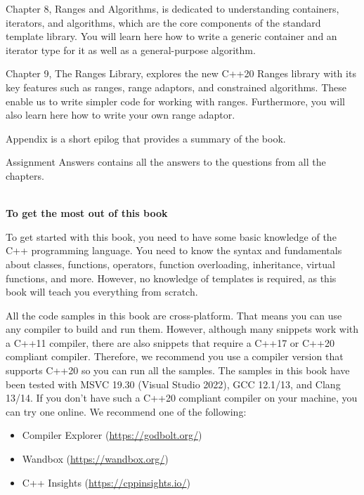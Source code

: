Chapter 8, Ranges and Algorithms, is dedicated to understanding containers, iterators, and algorithms, which are the core components of the standard template library. You will learn here how to write a generic container and an iterator type for it as well as a general-purpose algorithm.

Chapter 9, The Ranges Library, explores the new C++20 Ranges library with its key features such as ranges, range adaptors, and constrained algorithms. These enable us to write simpler code for working with ranges. Furthermore, you will also learn here how to write your own range adaptor.

Appendix is a short epilog that provides a summary of the book.

Assignment Answers contains all the answers to the questions from all the chapters.

\hspace*{\fill} \\ %
\noindent
\textbf{To get the most out of this book}

To get started with this book, you need to have some basic knowledge of the C++ programming language. You need to know the syntax and fundamentals about classes, functions, operators, function overloading, inheritance, virtual functions, and more. However, no knowledge of templates is required, as this book will teach you everything from scratch.

All the code samples in this book are cross-platform. That means you can use any compiler to build and run them. However, although many snippets work with a C++11 compiler, there are also snippets that require a C++17 or C++20 compliant compiler. Therefore, we recommend you use a compiler version that supports C++20 so you can run all the samples. The samples in this book have been tested with MSVC 19.30 (Visual Studio 2022), GCC 12.1/13, and Clang 13/14. If you don’t have such a C++20 compliant compiler on your machine, you can try one online. We recommend one of the following:

\begin{itemize}
\item
Compiler Explorer (\url{https://godbolt.org/})

\item
Wandbox (\url{https://wandbox.org/})

\item
C++ Insights (\url{https://cppinsights.io/})
\end{itemize}

